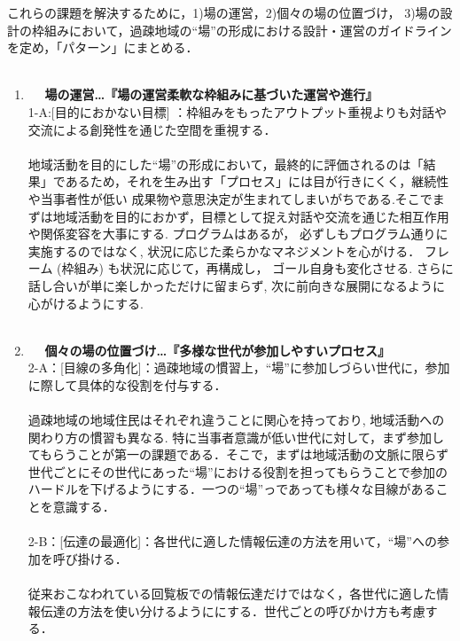 \documentclass[a4paper]{jsarticle}
\begin{document}
これらの課題を解決するために，1)場の運営，2)個々の場の位置づけ， 3)場の設計の枠組みにおいて，過疎地域の“場”の形成における設計・運営のガイドラインを定め，「パターン」にまとめる．\\\\
\begin{enumerate}
\item　
\textbf{場の運営…『場の運営柔軟な枠組みに基づいた運営や進行』}\\
1-A:[目的におかない目標] ：枠組みをもったアウトプット重視よりも対話や交流による創発性を通じた空間を重視する．\\\\
地域活動を目的にした“場”の形成において，最終的に評価されるのは「結果」であるため，それを生み出す「プロセス」には目が行きにくく，継続性や当事者性が低い
成果物や意思決定が生まれてしまいがちである.そこでまずは地域活動を目的におかず，目標として捉え対話や交流を通じた相互作用や関係変容を大事にする. プログラムはあるが， 必ずしもプログラム通りに実施するのではなく, 状況に応じた柔らかなマネジメントを心がける． フレーム (枠組み) も状況に応じて，再構成し， ゴール自身も変化させる. さらに話し合いが単に楽しかっただけに留まらず, 次に前向きな展開になるように心がけるようにする.\\\\

\item　
\textbf{個々の場の位置づけ…『多様な世代が参加しやすいプロセス』}\\
2-A：[目線の多角化]：過疎地域の慣習上，“場”に参加しづらい世代に，参加に際して具体的な役割を付与する．\\\\
過疎地域の地域住民はそれぞれ違うことに関心を持っており, 地域活動への関わり方の慣習も異なる. 特に当事者意識が低い世代に対して，まず参加してもらうことが第一の課題である．そこで，まずは地域活動の文脈に限らず世代ごとにその世代にあった“場”における役割を担ってもらうことで参加のハードルを下げるようにする．一つの“場”っであっても様々な目線があることを意識する．\\\\

2-B：[伝達の最適化]：各世代に適した情報伝達の方法を用いて，“場”への参加を呼び掛ける．\\\\
従来おこなわれている回覧板での情報伝達だけではなく，各世代に適した情報伝達の方法を使い分けるようににする．世代ごとの呼びかけ方も考慮する．\\\\



\end{enumerate}
\end{document}
